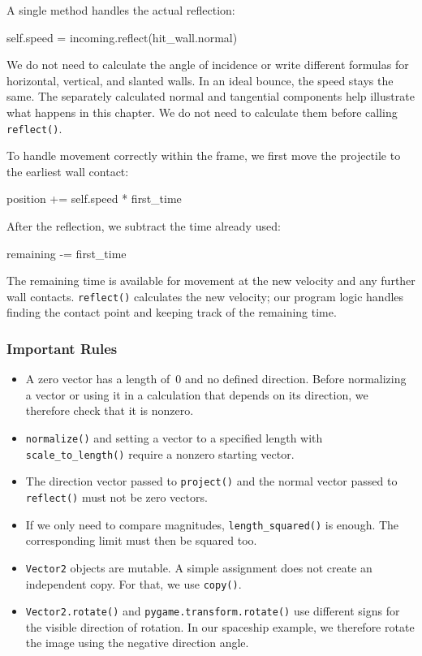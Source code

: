 A single method handles the actual reflection:
\begin{codebox}
	self.speed = incoming.reflect(hit_wall.normal)
\end{codebox}

We do not need to calculate the angle of incidence or write different formulas for horizontal, vertical, and slanted walls. In an ideal bounce, the speed stays the same. The separately calculated normal and tangential components help illustrate what happens in this chapter. We do not need to calculate them before calling \texttt{reflect()}.

To handle movement correctly within the frame, we first move the projectile to the earliest wall contact:
\begin{codebox}
	position += self.speed * first_time
\end{codebox}

After the reflection, we subtract the time already used:
\begin{codebox}
	remaining -= first_time
\end{codebox}

The remaining time is available for movement at the new velocity and any further wall contacts. \texttt{reflect()} calculates the new velocity; our program logic handles finding the contact point and keeping track of the remaining time.

\newpage
\subsubsection*{Important Rules}

\begin{itemize}
	\item A zero vector has a length of~0 and no defined direction. Before normalizing a vector or using it in a calculation that depends on its direction, we therefore check that it is nonzero.
	
	\item \texttt{normalize()} and setting a vector to a specified length with \texttt{scale\_to\_length()} require a nonzero starting vector.
	
	\item The direction vector passed to \texttt{project()} and the normal vector passed to \texttt{reflect()} must not be zero vectors.
	
	\item If we only need to compare magnitudes, \texttt{length\_squared()} is enough. The corresponding limit must then be squared too.
	
	\item \texttt{Vector2} objects are mutable. A simple assignment does not create an independent copy. For that, we use \texttt{copy()}.
	
	\item \texttt{Vector2.rotate()} and \texttt{pygame.transform.rotate()} use different signs for the visible direction of rotation. In our spaceship example, we therefore rotate the image using the negative direction angle.
\end{itemize}

